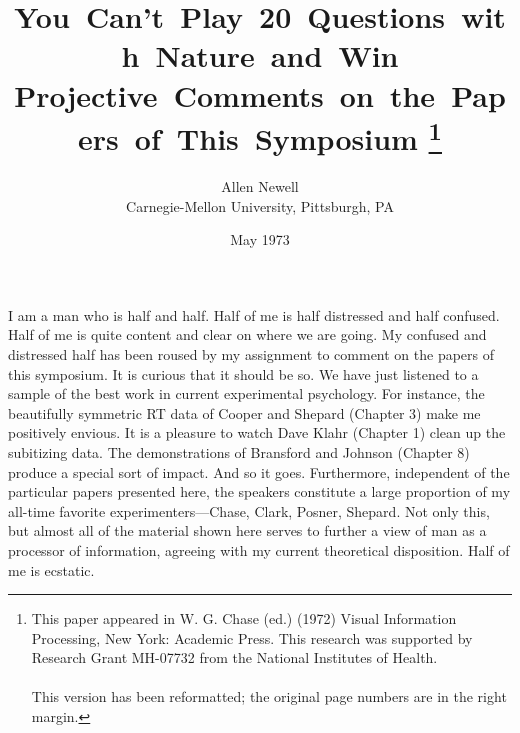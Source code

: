 \documentclass{paper}
\begin{document}
\title{ \mbox{You Can't Play 20 Questions with Nature and Win} \\
	 \mbox{\large Projective Comments on the Papers of This Symposium} \hspace{-0.66em}
	 \footnote{This paper appeared in W. G. Chase (ed.) (1972) Visual Information Processing, New York: Academic Press. This research was supported by Research Grant MH-07732 from the National Institutes of Health.\\ \\This version has been reformatted; the original page numbers are in the right margin.}}

\author{Allen Newell\\ \large Carnegie-Mellon University, Pittsburgh, PA}

\date{May 1973}
\maketitle
 
 
\raggedbottom
\addtolength{\topskip}{0ex plus 5ex}


I am a man who is half and half. Half of me is half distressed and half confused. Half of me is quite content and clear on where we are going. My confused and distressed half has been roused by my assignment to comment on the papers of this symposium. It is curious that it should be so. We have just listened to a sample of the best work in current experimental psychology. For instance, the beautifully symmetric RT data of Cooper and Shepard (Chapter 3) make me positively envious. It is a pleasure to watch Dave Klahr (Chapter 1) clean up the subitizing data. The demonstrations of Bransford and Johnson (Chapter 8) produce a special sort of impact. And so it goes. Furthermore, independent of the particular papers presented here, the speakers constitute a large proportion of my all-time favorite experimenters---Chase, Clark, Posner, Shepard. Not only this, but almost all of the material shown here serves to further a view of man as a processor of information, agreeing with my current 
theoretical disposition. Half of me is ecstatic.
\end{document}
